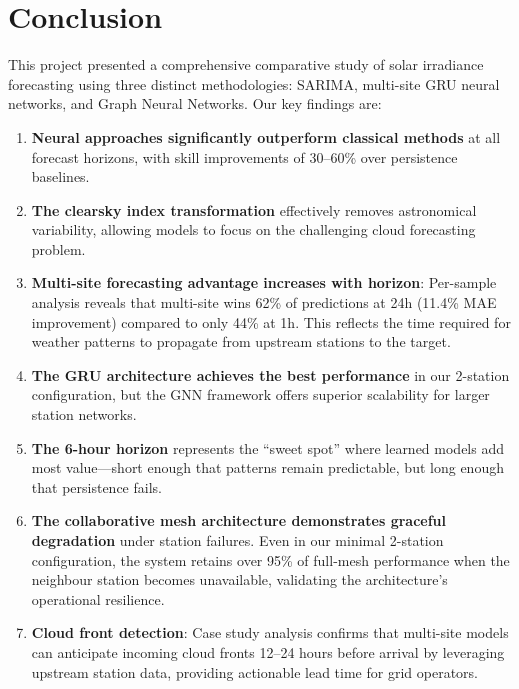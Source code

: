 \documentclass[11pt,a4paper]{article}
\begin{document}
\section{Conclusion}
\label{sec:conclusion}

This project presented a comprehensive comparative study of solar irradiance forecasting using three distinct methodologies: SARIMA, multi-site GRU neural networks, and Graph Neural Networks. Our key findings are:

\begin{enumerate}
    \item \textbf{Neural approaches significantly outperform classical methods} at all forecast horizons, with skill improvements of 30--60\% over persistence baselines.
    
    \item \textbf{The clearsky index transformation} effectively removes astronomical variability, allowing models to focus on the challenging cloud forecasting problem.
    
    \item \textbf{Multi-site forecasting advantage increases with horizon}: Per-sample analysis reveals that multi-site wins 62\% of predictions at 24h (11.4\% MAE improvement) compared to only 44\% at 1h. This reflects the time required for weather patterns to propagate from upstream stations to the target.
    
    \item \textbf{The GRU architecture achieves the best performance} in our 2-station configuration, but the GNN framework offers superior scalability for larger station networks.
    
    \item \textbf{The 6-hour horizon} represents the ``sweet spot'' where learned models add most value---short enough that patterns remain predictable, but long enough that persistence fails.
    
    \item \textbf{The collaborative mesh architecture demonstrates graceful degradation} under station failures. Even in our minimal 2-station configuration, the system retains over 95\% of full-mesh performance when the neighbour station becomes unavailable, validating the architecture's operational resilience.
    
    \item \textbf{Cloud front detection}: Case study analysis confirms that multi-site models can anticipate incoming cloud fronts 12--24 hours before arrival by leveraging upstream station data, providing actionable lead time for grid operators.
\end{enumerate}
\end{document}
